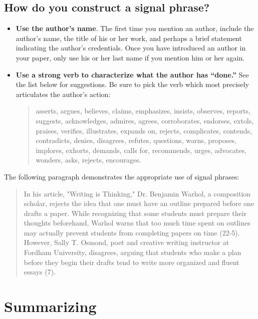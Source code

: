 \subsection{How do you construct a signal phrase?}
 
\begin{itemize}
\item \textbf{Use the author's name}. The first time you mention an author, include the 
author's name, the title of his or her work, and perhaps a brief statement indicating the 
author's credentials. Once you have introduced an author in your paper, only use his or 
her last name if you mention him or her again.

\item \textbf{Use a strong verb to characterize what the author has “done.”} See the list 
below for suggestions. Be sure to pick the verb which most precisely articulates the 
author's action:
 
\begin{quote}asserts, argues, believes, claims, emphasizes, insists, observes, reports, 
suggests, acknowledges, admires, agrees, corroborates, endorses, extols, praises, 
verifies, illustrates, expands on, rejects, complicates, contends, contradicts, denies, 
disagrees, refutes, questions, warns, proposes, implores, exhorts, demands, calls for, 
recommends, urges, advocates, wonders, asks, rejects, encourages.\end{quote}
 \end{itemize}
 
The following paragraph demonstrates the appropriate use of signal phrases:
 
 \begin{quote}
In his article, "Writing is Thinking," Dr. Benjamin Warhol, a composition scholar, rejects 
the idea that one must have an outline prepared before one drafts a paper. While 
recognizing that some students must prepare their thoughts beforehand, Warhol warns 
that too much time spent on outlines may actually prevent students from completing 
papers on time (22-5). However, Sally T. Osmond, poet and  creative writing instructor at 
Fordham University, disagrees, arguing that students who make a plan before they 
begin their drafts tend to write more organized and fluent essays (7). \end{quote}

\section{Summarizing}

